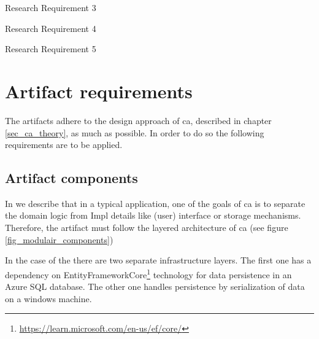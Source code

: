 {Research Requirement 3}

{Research Requirement 4}

{Research Requirement 5}

\section{Artifact requirements} \label{sec_artifact_requirements}

The artifacts adhere to the design approach of \gls{ca}, described in chapter
\ref{sec_ca_theory}, as much as possible. In order to do so the following
requirements are to be applied.

\subsection{Artifact components}
In  we describe that in a typical application, one of the goals of
\gls{ca} is to separate the domain logic from Impl details like (user) interface
or storage mechanisms. Therefore, the artifact must follow the layered architecture of
\gls{ca} (see figure \ref{fig_modulair_components})

In the case of the  there are two separate infrastructure
layers. The first one has a dependency on
EntityFrameworkCore\footnote{\url{https://learn.microsoft.com/en-us/ef/core/}} technology
for data persistence in an Azure SQL database. The other one handles persistence by
serialization of data on a windows machine.


